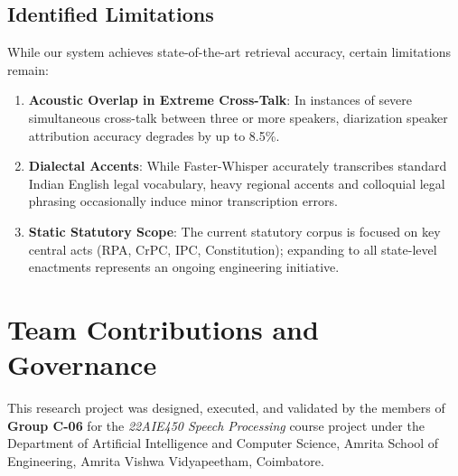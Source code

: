 \documentclass{llncs}
\begin{document}
\subsection{Identified Limitations}
While our system achieves state-of-the-art retrieval accuracy, certain limitations remain:
\begin{enumerate}
    \item \textbf{Acoustic Overlap in Extreme Cross-Talk}: In instances of severe simultaneous cross-talk between three or more speakers, diarization speaker attribution accuracy degrades by up to 8.5\%.
    \item \textbf{Dialectal Accents}: While Faster-Whisper accurately transcribes standard Indian English legal vocabulary, heavy regional accents and colloquial legal phrasing occasionally induce minor transcription errors.
    \item \textbf{Static Statutory Scope}: The current statutory corpus is focused on key central acts (RPA, CrPC, IPC, Constitution); expanding to all state-level enactments represents an ongoing engineering initiative.
\end{enumerate}


\section{Team Contributions and Governance}
\label{sec:contributions}

This research project was designed, executed, and validated by the members of \textbf{Group C-06} for the \textit{22AIE450 Speech Processing} course project under the Department of Artificial Intelligence and Computer Science, Amrita School of Engineering, Amrita Vishwa Vidyapeetham, Coimbatore. 
\end{document}
